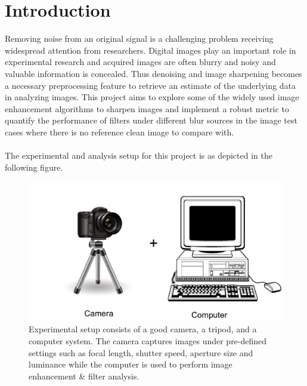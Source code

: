 \graphicspath{{mehul_pics/}}%

\section{Introduction}
Removing noise from an original signal is a challenging problem receiving widespread attention from researchers. Digital images play an important role in experimental research and acquired images are often blurry and noisy and valuable information is concealed. Thus denoising and image sharpening becomes a necessary  preprocessing feature to retrieve an estimate of the underlying data  in analyzing images. This project aims to explore some of the widely used image enhancement algorithms to sharpen images and implement a robust metric to quantify the performance of filters under different blur sources in the image test cases where there is no reference clean image to compare with.\\

\\
The experimental and analysis setup for this project is as depicted in the following figure.
\begin{figure}[h!]
  \centering
                \centering
                \includegraphics[width=.6\textwidth]{experimental_setup.png}
                \caption{Experimental setup consists of a good camera, a tripod, and a computer system. The camera captures images under pre-defined settings such as focal length, shutter speed, aperture size and luminance while the computer is used to perform image enhancement \& filter analysis.}
\end{figure}

